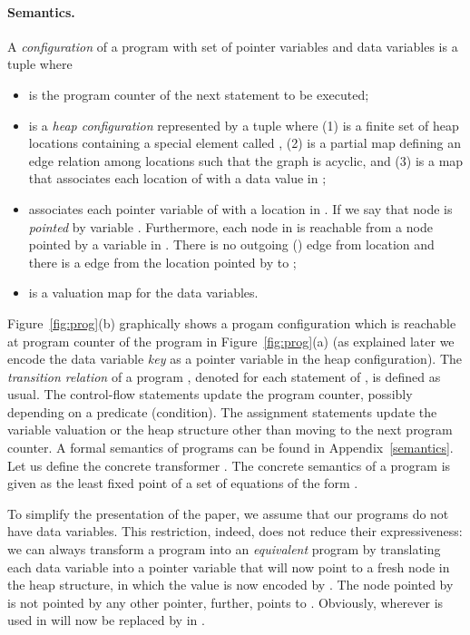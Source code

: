 \documentclass{llncs}
\begin{document}
\paragraph{Semantics.} A {\em configuration}  of a program  with set of pointer variables  and data variables  is a tuple  where
\begin{itemize}
\item  is the program counter of the next statement to be executed;

\item  is a {\em heap configuration} represented by a tuple  where (1)  is a finite set of heap locations containing a special element called , (2)  is a partial map defining an edge relation among locations such that the graph  is acyclic, and (3)  is a  map that associates each location of  with a data value in ;
\item  associates each pointer variable of  with a location in . If  we say that node  is {\em pointed} by variable . Furthermore, each node in  is reachable from a node pointed by a variable in . There is no outgoing () edge from location  and there is a  edge from the location pointed by  to ;
\item  is a valuation map for the data variables.
\end{itemize}


Figure~\ref{fig:prog}(b) graphically shows a progam configuration which is reachable at program counter  of the program in Figure~\ref{fig:prog}(a) (as explained later we encode the data variable \emph{key} as a pointer variable in the heap configuration).
The {\em transition relation} of a program , denoted  for each statement  of , is defined as usual.  The control-flow statements update the program counter, possibly depending on a predicate (condition).
The assignment statements update the variable valuation or the heap structure other than moving to the next program counter. A formal semantics of programs can be found in Appendix~\ref{semantics}.
Let us define the concrete transformer . The concrete semantics of a program is given as the least fixed point of a set of equations of the form . 




To simplify the presentation of the paper, we assume that our programs do not have data variables. This restriction, indeed, does not reduce their expressiveness: we can always transform a program  into an {\em equivalent} program  by translating each data variable  into a pointer variable that will now point to a fresh node in the heap structure, in  which the value  is now encoded by . The node pointed by  is not pointed by any other pointer, further,  points to . Obviously, wherever  is used in  will now be replaced by  in . 
\end{document}

